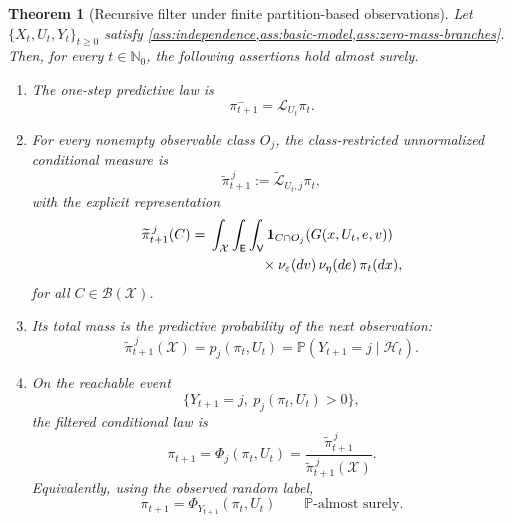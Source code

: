 \documentclass[10pt,twocolumn]{article}
\newtheorem{theorem}{Theorem}
\theoremstyle{remark}
\newcommand{\N}{\mathbb{N}}
\newcommand{\Pp}{\mathbb{P}}
\newcommand{\B}{\mathcal{B}}
\newcommand{\Hh}{\mathcal{H}}
\newcommand{\Xcal}{\mathcal{X}}
\newcommand{\one}{\mathbf{1}}
\begin{document}
\begin{theorem}[Recursive filter under finite partition-based observations]
	\label{thm:main-recursive-filter}
	Let \(\{X_t,U_t,Y_t\}_{t\geq0}\) satisfy \cref{ass:independence,ass:basic-model,ass:zero-mass-branches}. Then, for every \(t\in\N_0\), the following assertions hold almost surely.
	
	\begin{enumerate}[label=\textnormal{(\roman*)},leftmargin=*]
		\item The one-step predictive law is
		\begin{equation*}
			\pi_{t+1}^{-}=\mathcal L_{U_t}\pi_t.
			\label{eq:main-theorem-prediction}
		\end{equation*}
		
		\item For every nonempty observable class \(O_j\), the class-restricted unnormalized conditional measure is
		\begin{equation}
			\widetilde\pi_{t+1}^{\,j}
			:=\widetilde{\mathcal L}_{U_t,j}\pi_t,
			\label{eq:main-theorem-unnormalized}
		\end{equation}
		with the explicit representation
		\begin{equation*}
			\begin{split}
				\widetilde\pi_{t+1}^{\,j}(C)
				={}&\int_{\Xcal}\int_{\mathsf E}\int_{\mathsf V}
				\one_{C\cap O_j}\!\left(G(x,U_t,e,v)\right)
				\\
				&\hspace{1.3cm}\times
				\nu_\varepsilon(dv)\,\nu_\eta(de)\,\pi_t(dx),
			\end{split}
			\label{eq:main-theorem-integral}
		\end{equation*}
		for all \(C\in\B(\Xcal)\).
		
		\item Its total mass is the predictive probability of the next observation:
		\begin{equation*}
			\widetilde\pi_{t+1}^{\,j}(\Xcal)
			=p_j(\pi_t,U_t)
			=\Pp(Y_{t+1}=j\mid\Hh_t).
			\label{eq:main-theorem-observation-probability}
		\end{equation*}
		
		\item On the reachable event
		\[
		\{Y_{t+1}=j,\ p_j(\pi_t,U_t)>0\},
		\]
		the filtered conditional law is
		\begin{equation*}
			\pi_{t+1}
			=\Phi_j(\pi_t,U_t)
			=\frac{\widetilde\pi_{t+1}^{\,j}}
			{\widetilde\pi_{t+1}^{\,j}(\Xcal)}.
			\label{eq:main-theorem-normalization}
		\end{equation*}
		Equivalently, using the observed random label,
		\begin{equation*}
			\pi_{t+1}
			=\Phi_{Y_{t+1}}(\pi_t,U_t)
			\qquad \Pp\text{-almost surely}.
			\label{eq:random-filter-recursion}
		\end{equation*}
	\end{enumerate}
	

\end{theorem}
\end{document}
